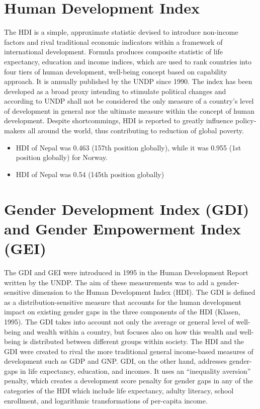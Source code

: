 \documentclass[
]{book}
\providecommand{\tightlist}{%
  \setlength{\itemsep}{0pt}\setlength{\parskip}{0pt}}
\begin{document}
\hypertarget{human-development-index}{%
\section{Human Development Index}\label{human-development-index}}

The HDI is a simple, approximate statistic devised to introduce non-income factors and rival traditional economic indicators within a framework of international development. Formula produces composite statistic of life expectancy, education and income indices, which are used to rank countries into four tiers of human development, well-being concept based on capability approach. It is annually published by the UNDP since 1990. The index has been developed as a broad proxy intending to stimulate political changes and according to UNDP shall not be considered the only measure of a country's level of development in general nor the ultimate measure within the concept of human development. Despite shortcommings, HDI is reported to greatly influence policy-makers all around the world, thus contributing to reduction of global poverty.

\begin{itemize}
\tightlist
\item
  HDI of Nepal was 0.463 (157th position globally), while it was 0.955 (1st position globally) for Norway.
\item
  HDI of Nepal was 0.54 (145th position globally)
\end{itemize}

\hypertarget{gender-development-index-gdi-and-gender-empowerment-index-gei}{%
\section{Gender Development Index (GDI) and Gender Empowerment Index (GEI)}\label{gender-development-index-gdi-and-gender-empowerment-index-gei}}

The GDI and GEI were introduced in 1995 in the Human Development Report written by the UNDP. The aim of these measurements was to add a gender-sensitive dimension to the Human Development Index (HDI). The GDI is defined as a distribution-sensitive measure that accounts for the human development impact on existing gender gaps in the three components of the HDI (Klasen, 1995). The GDI takes into account not only the average or general level of well-being and wealth within a country, but focuses also on how this wealth and well-being is distributed between different groups within society. The HDI and the GDI were created to rival the more traditional general income-based measures of development such as GDP and GNP. GDI, on the other hand, addresses gender-gaps in life expectancy, education, and incomes. It uses an ``inequality aversion'' penalty, which creates a development score penalty for gender gaps in any of the categories of the HDI which include life expectancy, adulty literacy, school enrollment, and logarithmic transformations of per-capita income.
\end{document}
